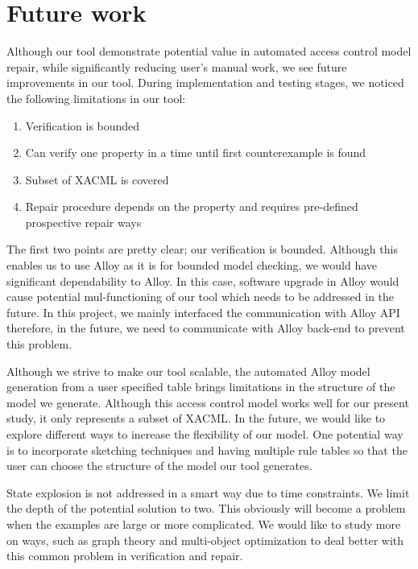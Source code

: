 \documentclass{acm_proc_article-sp}
\begin{document}
\section{Future work}

Although our tool demonstrate potential value in automated access control model repair, while significantly reducing user's manual work, we see future improvements in our tool. During implementation and testing stages, we noticed the following limitations in our tool:

\begin{enumerate}
\item Verification is bounded
\item Can verify one property in a time until first counterexample is found
\item Subset of XACML is covered
\item Repair procedure depends on the property and requires pre-defined prospective repair ways
\end{enumerate}

The first two points are pretty clear; our verification is bounded. Although this enables us to use Alloy as it is for bounded model checking, we would have significant dependability to Alloy. In this case, software upgrade in Alloy would cause potential mul-functioning of our tool which needs to be addressed in the future. In this project, we mainly interfaced the communication with Alloy API therefore, in the future, we need to communicate with Alloy back-end to prevent this problem.

Although we strive to make our tool scalable, the automated Alloy model generation from a user specified table brings limitations in the structure of the model we generate. Although this access control model works well for our present study, it only represents a subset of XACML. In the future, we would like to explore different ways to increase the flexibility of our model. One potential way is to incorporate sketching techniques and having multiple rule tables so that the user can choose the structure of the model our tool generates.

State explosion is not addressed in a smart way due to time constraints. We limit the depth of the potential solution to two. This obviously will become a problem when the examples are large or more complicated. We would like to study more on ways, such as graph theory and multi-object optimization to deal better with this common problem in verification and repair.
\end{document}
